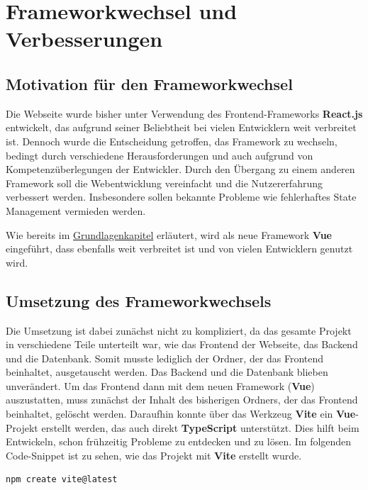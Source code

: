 \section{Frameworkwechsel und Verbesserungen}

\subsection{Motivation für den Frameworkwechsel}

Die Webseite wurde bisher unter Verwendung des Frontend-Frameworks \textbf{React.js} entwickelt, das aufgrund seiner Beliebtheit bei vielen Entwicklern weit verbreitet ist. Dennoch wurde die Entscheidung getroffen, das Framework zu wechseln, bedingt durch verschiedene Herausforderungen und auch aufgrund von Kompetenzüberlegungen der Entwickler. Durch den Übergang zu einem anderen Framework soll die Webentwicklung vereinfacht und die Nutzererfahrung verbessert werden. Insbesondere sollen bekannte Probleme wie fehlerhaftes State Management vermieden werden.

Wie bereits im \hyperref[chapter:3-frontend-frameworks]{Grundlagenkapitel} erläutert, wird als neue Framework \textbf{Vue} eingeführt, dass ebenfalls weit verbreitet ist und von vielen Entwicklern genutzt wird.

\subsection{Umsetzung des Frameworkwechsels}

Die Umsetzung ist dabei zunächst nicht zu kompliziert, da das gesamte Projekt in verschiedene Teile unterteilt war, wie das Frontend der Webseite, das Backend und die Datenbank. Somit musste lediglich der Ordner, der das Frontend beinhaltet, ausgetauscht werden. Das Backend und die Datenbank blieben unverändert. Um das Frontend dann mit dem neuen Framework (\textbf{Vue}) auszustatten, muss zunächst der Inhalt des bisherigen Ordners, der das Frontend beinhaltet, gelöscht werden. Daraufhin konnte über das Werkzeug \textbf{Vite} ein \textbf{Vue}-Projekt erstellt werden, das auch direkt \textbf{TypeScript} unterstützt. Dies hilft beim Entwickeln, schon frühzeitig Probleme zu entdecken und zu lösen. Im folgenden Code-Snippet ist zu sehen, wie das Projekt mit \textbf{Vite} erstellt wurde.

\begin{lstlisting}[language={bash}, caption={Initialisierung des Vue Projektes mit Vite \cite{vitejs-getting-started}}]
npm create vite@latest
\end{lstlisting}

